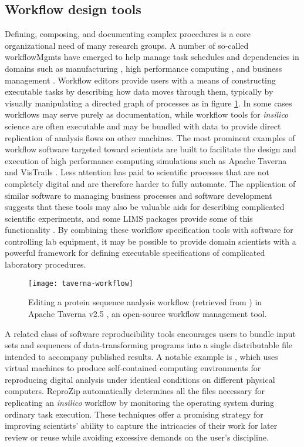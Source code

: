 \documentclass[../thesis]{subfiles}
\begin{document}
\subsection{Workflow design tools}
Defining, composing, and documenting complex procedures is a core
organizational need of many research groups. A number of so-called
\glspl{workflowMgmt} have emerged to help manage task schedules and
dependencies in domains such as manufacturing
\cite{Allweyer:2010:BPM:1841147}, high performance computing
\cite{VisTrails}, and business management
\cite{cardoso2004workflow}. Workflow editors provide users with a
means of constructing executable tasks by describing how
data moves through them, typically by visually manipulating a directed
graph of processes as in figure \ref{fig:TavernaWorkflow}. In some
cases workflows may serve purely as
documentation, while workflow tools for \textit{\gls{insilico}} science
are often executable and may be bundled with data to provide direct
replication of analysis flows on other machines. The most prominent
examples of workflow software
targeted toward scientists are built to facilitate the design and
execution of high performance computing simulations such as Apache
Taverna \cite{Taverna} and VisTrails \cite{VisTrails}. Less
attention has paid to scientific processes that are not completely digital
and are therefore harder to fully automate. The application
of similar software to managing business processes and software
development suggests that these tools may also be valuable aids for
describing complicated scientific experiments, and some \gls{LIMS} packages
provide some of this functionality \cite{CoreLIMS}. By combining these
workflow specification tools with software for controlling lab
equipment, it may be possible to provide domain scientists with a
powerful framework for defining executable specifications of
complicated laboratory procedures.

\begin{figure}
  \texttt{[image: taverna-workflow]}
  \caption{
    Editing a protein sequence analysis workflow
    (retrieved from \cite{ExampleWorkflow}) in
    Apache Taverna v2.5 \cite{Taverna}, an open-source workflow
    management tool.
    \label{fig:TavernaWorkflow}
  }
\end{figure}

A related class of software reproducibility tools encourages users to
bundle input sets and sequences of data-transforming programs into a
single distributable file intended to accompany published results.
A notable example is \cite{ReproZip}, which uses virtual machines to
produce self-contained computing environments for reproducing digital
analysis under identical conditions on different physical
computers. ReproZip automatically determines all the files necessary
for replicating an \textit{\gls{insilico}} workflow by monitoring the operating
system during ordinary task execution. These techniques offer a
promising strategy for improving scientists' ability to capture the
intricacies of their work for later review or reuse while avoiding
excessive demands on the user's discipline.
\end{document}
